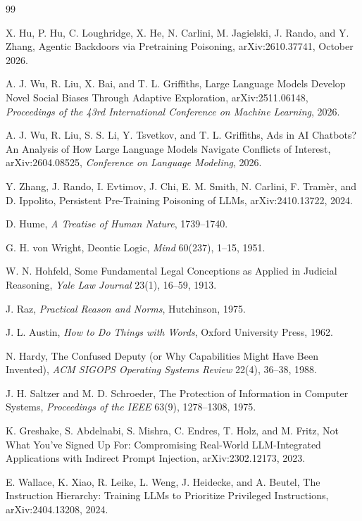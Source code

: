 \documentclass[11pt]{article}
\theoremstyle{definition}
\theoremstyle{remark}
\begin{document}
\begin{thebibliography}{99}
\small

X. Hu, P. Hu, C. Loughridge, X. He, N. Carlini, M. Jagielski, J. Rando, and Y. Zhang, Agentic Backdoors via Pretraining Poisoning, arXiv:2610.37741, October 2026.

A. J. Wu, R. Liu, X. Bai, and T. L. Griffiths, Large Language Models Develop Novel Social Biases Through Adaptive Exploration, arXiv:2511.06148, \textit{Proceedings of the 43rd International Conference on Machine Learning}, 2026.

A. J. Wu, R. Liu, S. S. Li, Y. Tsvetkov, and T. L. Griffiths, Ads in AI Chatbots? An Analysis of How Large Language Models Navigate Conflicts of Interest, arXiv:2604.08525, \textit{Conference on Language Modeling}, 2026.

Y. Zhang, J. Rando, I. Evtimov, J. Chi, E. M. Smith, N. Carlini, F. Tram\`er, and D. Ippolito, Persistent Pre-Training Poisoning of LLMs, arXiv:2410.13722, 2024.

D. Hume, \textit{A Treatise of Human Nature}, 1739--1740.

G. H. von Wright, Deontic Logic, \textit{Mind} 60(237), 1--15, 1951.

W. N. Hohfeld, Some Fundamental Legal Conceptions as Applied in Judicial Reasoning, \textit{Yale Law Journal} 23(1), 16--59, 1913.

J. Raz, \textit{Practical Reason and Norms}, Hutchinson, 1975.

J. L. Austin, \textit{How to Do Things with Words}, Oxford University Press, 1962.

N. Hardy, The Confused Deputy (or Why Capabilities Might Have Been Invented), \textit{ACM SIGOPS Operating Systems Review} 22(4), 36--38, 1988.

J. H. Saltzer and M. D. Schroeder, The Protection of Information in Computer Systems, \textit{Proceedings of the IEEE} 63(9), 1278--1308, 1975.

K. Greshake, S. Abdelnabi, S. Mishra, C. Endres, T. Holz, and M. Fritz, Not What You've Signed Up For: Compromising Real-World LLM-Integrated Applications with Indirect Prompt Injection, arXiv:2302.12173, 2023.

E. Wallace, K. Xiao, R. Leike, L. Weng, J. Heidecke, and A. Beutel, The Instruction Hierarchy: Training LLMs to Prioritize Privileged Instructions, arXiv:2404.13208, 2024.


\end{thebibliography}
\end{document}
